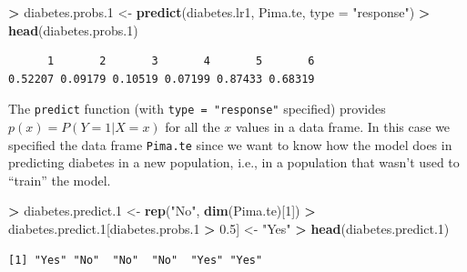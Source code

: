 \documentclass[
]{krantz}
\makeatletter
\newenvironment{Shaded}{\begin{snugshade}}{\end{snugshade}}
\newcommand{\DataTypeTok}[1]{\textcolor[rgb]{0.27,0.27,0.27}{#1}}
\newcommand{\DecValTok}[1]{\textcolor[rgb]{0.06,0.06,0.06}{#1}}
\newcommand{\FloatTok}[1]{\textcolor[rgb]{0.06,0.06,0.06}{#1}}
\newcommand{\KeywordTok}[1]{\textcolor[rgb]{0.27,0.27,0.27}{\textbf{#1}}}
\newcommand{\NormalTok}[1]{#1}
\newcommand{\OperatorTok}[1]{\textcolor[rgb]{0.43,0.43,0.43}{\textbf{#1}}}
\newcommand{\StringTok}[1]{\textcolor[rgb]{0.5,0.5,0.5}{#1}}
\newenvironment{kframe}{%
\medskip{}
\setlength{\fboxsep}{.8em}
 \def\at@end@of@kframe{}%
 \ifinner\ifhmode%
  \def\at@end@of@kframe{\end{minipage}}%
  \begin{minipage}{\columnwidth}%
 \fi\fi%
 \def\FrameCommand##1{\hskip\@totalleftmargin \hskip-\fboxsep
 \colorbox{shadecolor}{##1}\hskip-\fboxsep
     \hskip-\linewidth \hskip-\@totalleftmargin \hskip\columnwidth}%
 \MakeFramed {\advance\hsize-\width
   \@totalleftmargin\z@ \linewidth\hsize
   \@setminipage}}%
 {\par\unskip\endMakeFramed%
 \at@end@of@kframe}
\renewenvironment{Shaded}{\begin{kframe}}{\end{kframe}}
\makeatother
\begin{document}
\begin{Shaded}
\begin{Highlighting}[]
\OperatorTok{\textgreater{}}\StringTok{ }\NormalTok{diabetes.probs}\FloatTok{.1}\NormalTok{ \textless{}{-}}\StringTok{ }\KeywordTok{predict}\NormalTok{(diabetes.lr1, Pima.te, }\DataTypeTok{type =} \StringTok{"response"}\NormalTok{)}
\OperatorTok{\textgreater{}}\StringTok{ }\KeywordTok{head}\NormalTok{(diabetes.probs}\FloatTok{.1}\NormalTok{)}
\end{Highlighting}
\end{Shaded}

\begin{verbatim}
      1       2       3       4       5       6 
0.52207 0.09179 0.10519 0.07199 0.87433 0.68319 
\end{verbatim}

The \texttt{predict} function (with \texttt{type\ =\ "response"} specified) provides \(p(x) = P(Y = 1 | X = x)\) for all the \(x\) values in a data frame. In this case we specified the data frame \texttt{Pima.te} since we want to know how the model does in predicting diabetes in a new population, i.e., in a population that wasn't used to ``train'' the model.

\begin{Shaded}
\begin{Highlighting}[]
\OperatorTok{\textgreater{}}\StringTok{ }\NormalTok{diabetes.predict}\FloatTok{.1}\NormalTok{ \textless{}{-}}\StringTok{ }\KeywordTok{rep}\NormalTok{(}\StringTok{"No"}\NormalTok{, }\KeywordTok{dim}\NormalTok{(Pima.te)[}\DecValTok{1}\NormalTok{])}
\OperatorTok{\textgreater{}}\StringTok{ }\NormalTok{diabetes.predict}\FloatTok{.1}\NormalTok{[diabetes.probs}\FloatTok{.1} \OperatorTok{\textgreater{}}\StringTok{ }\FloatTok{0.5}\NormalTok{] \textless{}{-}}\StringTok{ "Yes"}
\OperatorTok{\textgreater{}}\StringTok{ }\KeywordTok{head}\NormalTok{(diabetes.predict}\FloatTok{.1}\NormalTok{)}
\end{Highlighting}
\end{Shaded}

\begin{verbatim}
[1] "Yes" "No"  "No"  "No"  "Yes" "Yes"
\end{verbatim}

\begin{Shaded}
\end{Shaded}
\end{document}
